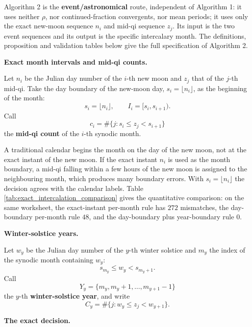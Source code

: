 Algorithm 2 is the \textbf{event/astronomical} route, independent of Algorithm 1: it uses neither \(\rho\), nor continued-fraction convergents, nor mean periods; it uses only the exact new-moon sequence \(n_i\) and mid-qi sequence \(z_j\). Its input is the two event sequences and its output is the specific intercalary month. The definitions, proposition and validation tables below give the full specification of Algorithm 2.

\textbf{Exact month intervals and mid-qi counts.}

\begin{definition}
\label{def:exact_month_term_count}
Let \(n_i\) be the Julian day number of the \(i\)-th new moon and \(z_j\) that of the \(j\)-th mid-qi. Take the day boundary of the new-moon day, \(s_i=\lfloor n_i\rfloor\), as the beginning of the month:
\[
s_i=\lfloor n_i\rfloor,\qquad I_i=[s_i,s_{i+1}).
\]
Call
\[
c_i=\#\{j: s_i\le z_j<s_{i+1}\}
\]
the \textbf{mid-qi count} of the \(i\)-th synodic month.
\end{definition}

\begin{remark}
\label{rem:exact_day_boundary}
A traditional calendar begins the month on the day of the new moon, not at the exact instant of the new moon. If the exact instant \(n_i\) is used as the month boundary, a mid-qi falling within a few hours of the new moon is assigned to the neighbouring month, which produces many boundary errors. With \(s_i=\lfloor n_i\rfloor\) the decision agrees with the calendar labels. Table \ref{tab:exact_intercalation_comparison} gives the quantitative comparison: on the same worksheet, the exact-instant per-month rule has \(272\) mismatches, the day-boundary per-month rule \(48\), and the day-boundary plus year-boundary rule \(0\).
\end{remark}

\textbf{Winter-solstice years.}

\begin{definition}
\label{def:winter_solstice_year}
Let \(w_y\) be the Julian day number of the \(y\)-th winter solstice and \(m_y\) the index of the synodic month containing \(w_y\):
\[
s_{m_y}\le w_y<s_{m_y+1}.
\]
Call
\[
Y_y=\{m_y,m_y+1,\dots,m_{y+1}-1\}
\]
the \(y\)-th \textbf{winter-solstice year}, and write
\[
C_y=\#\{j: w_y\le z_j<w_{y+1}\}.
\]
\end{definition}

\textbf{The exact decision.}

